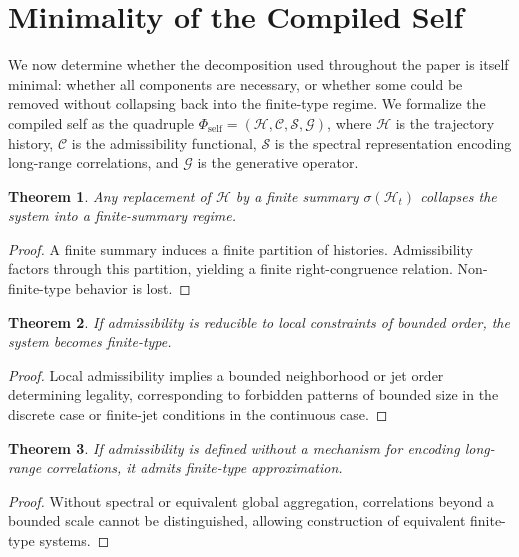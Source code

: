 \documentclass[12pt, a4paper]{article}
\theoremstyle{plain}
\newtheorem{theorem}{Theorem}[section]
\theoremstyle{definition}
\theoremstyle{remark}
\begin{document}
\section{Minimality of the Compiled Self}

We now determine whether the decomposition used throughout the paper is itself minimal: whether all components are necessary, or whether some could be removed without collapsing back into the finite-type regime. We formalize the compiled self as the quadruple $\Phi_{\mathrm{self}} = (\mathcal{H}, \mathcal{C}, \mathcal{S}, \mathcal{G})$, where $\mathcal{H}$ is the trajectory history, $\mathcal{C}$ is the admissibility functional, $\mathcal{S}$ is the spectral representation encoding long-range correlations, and $\mathcal{G}$ is the generative operator.

\begin{theorem}
Any replacement of $\mathcal{H}$ by a finite summary $\sigma(\mathcal{H}_t)$ collapses the system into a finite-summary regime.
\end{theorem}

\begin{proof}
A finite summary induces a finite partition of histories. Admissibility factors through this partition, yielding a finite right-congruence relation. Non-finite-type behavior is lost.
\end{proof}

\begin{theorem}
If admissibility is reducible to local constraints of bounded order, the system becomes finite-type.
\end{theorem}

\begin{proof}
Local admissibility implies a bounded neighborhood or jet order determining legality, corresponding to forbidden patterns of bounded size in the discrete case or finite-jet conditions in the continuous case.
\end{proof}

\begin{theorem}
If admissibility is defined without a mechanism for encoding long-range correlations, it admits finite-type approximation.
\end{theorem}

\begin{proof}
Without spectral or equivalent global aggregation, correlations beyond a bounded scale cannot be distinguished, allowing construction of equivalent finite-type systems.
\end{proof}
\end{document}
